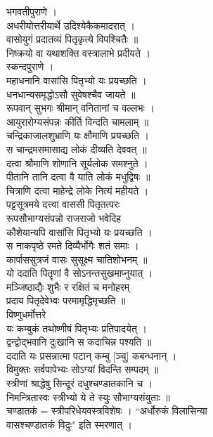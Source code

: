 \documentclass[11pt, openany]{book}
\begin{document}
{{{{{{{{{{{{{{{{{{{{{{{{{{{{{{{{{{{{{{{{{{{{{{{{{{{{{{{{{{{{{{{{{{{{{{{{{भगवतीपुराणे ।\\
अधरीयोत्तरीयार्थे उदिश्येकैकमादरात् ।\\
वासोयुगं प्रदातव्यं पितृकृत्ये विपश्चितैः ॥\\
निष्क्रयो वा यथाशक्ति वस्त्रालाभे प्रदीयते ।\\
स्कन्दपुराणे ।\\
महाधनानि वासांसि पितृभ्यो यः प्रयच्छति ।\\
धनधान्यसमृद्धोऽसौ सुवेषश्चैव जायते ॥\\
रूपवान् सुभगः श्रीमान् वनितानां च वल्लभः ।\\
आयुरारोग्यसंपन्नः कीर्ति विन्दति चामलाम् ॥\\
चन्द्रिकाजालशुभ्राणि यः क्षौमाणि प्रयच्छति ।\\
स चान्द्रमसमासाद्य लोकं दीव्यति देववत् ॥\\
दत्वा श्रौमाणि शोणानि सूर्यलोक समश्नुते ।\\
पीतानि तानि दत्वा वै याति लोकं मधुद्विषः ॥\\
चित्राणि दत्वा माहेन्द्रे लोके नित्यं महीयते ।\\
पट्टसूत्रमये दत्त्वा वाससी पितृतत्परः \textbar{}\\
रूपसौभाग्यसंपन्नो राजराजो भवेदिह \textbar{}\textbar{}\\
कौशेयान्यपि वासांसि पितृभ्यो यः प्रयच्छति ।\\
स नाकपृष्ठे रमते दिव्यैर्भोगैः शतं समाः ।\\
कार्पाससुत्रजं वासः सुसूक्ष्म चातिशोभनम् ॥\\
यो ददाति पितॄणां वै सोऽनन्तसुखमाप्नुयात् ।\\
मञ्जिष्ठाद्यैः शुभैः र रक्षितं च मनोहरम् \textbar{}\textbar{}\\
प्रदाय पितृदेवेभ्वः परमामृद्धिमृच्छति ॥\\
विष्णुधर्मोत्तरे \textbar{}\\
यः कम्बुकं तथोष्णीषं पितृभ्यः प्रतिपादयेत् ।\\
द्वन्द्वोद्भवानि दुःखानि स कदाचिन्न पश्यति ॥\\
ददाति यः प्रसन्नात्मा पटान् कम्बु {[}ञ्चु{]} कबन्धनान् ।\\
विमुक्तः सर्वपापेभ्यः सोऽग्यां विदन्ति सम्पदम् ॥\\
स्त्रीणां श्राद्धेषु सिन्दूरं दधुश्चण्डातकानि च ।\\
निमन्त्रितास्वः स्त्रीभ्यो ये ते स्युः सौभाग्यसंयुताः ॥\\
चण्डातकं = स्त्रीपरिधेयवस्त्रविशेषः । ``अर्धोरुकं विलासिन्या\\
वासश्चण्डातकं विदुः" इति स्मरणात् ।\\


}}}}}}}}}}}}}}}}}}}}}}}}}}}}}}}}}}}}}}}}}}}}}}}}}}}}}}}}}}}}}}}}}}}}}}}}}
\end{document}
